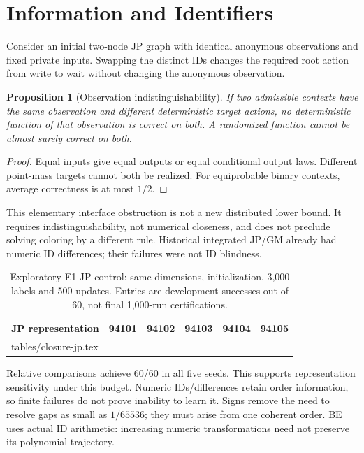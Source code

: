 \documentclass[10pt]{article}
\makeatletter
\newtheorem{proposition}{Proposition}
\let\closureinput\@@input
\makeatother
\begin{document}
\section{Information and Identifiers}\label{app:ids}
Consider an initial two-node JP graph with identical anonymous observations
and fixed private inputs. Swapping the distinct IDs changes the required
root action from write to wait without changing the anonymous observation.
\begin{proposition}[Observation indistinguishability]\label{prop:ids}
If two admissible contexts have the same observation and different
deterministic target actions, no deterministic function of that observation
is correct on both. A randomized function cannot be almost surely correct
on both.
\end{proposition}
\begin{proof}
Equal inputs give equal outputs or equal conditional output laws. Different
point-mass targets cannot both be realized. For equiprobable binary contexts,
average correctness is at most $1/2$.
\end{proof}
This elementary interface obstruction is not a new distributed lower bound.
It requires indistinguishability, not numerical closeness, and does not
preclude solving coloring by a different rule. Historical integrated JP/GM
already had numeric ID differences; their failures were not ID blindness.

\begin{table}[htbp]\centering\small
\begin{tabular}{lrrrrr}
\toprule JP representation & 94101 & 94102 & 94103 & 94104 & 94105 \\
\midrule
\closureinput tables/closure-jp.tex
\bottomrule
\end{tabular}
\caption{Exploratory E1 JP control: same dimensions, initialization, 3,000
labels and 500 updates. Entries are development successes out of 60,
not final 1,000-run certifications.}
\label{tab:ids}
\end{table}
Relative comparisons achieve 60/60 in all five seeds. This supports
representation sensitivity under this budget. Numeric IDs/differences retain
order information, so finite failures do not prove inability to learn it.
Signs remove the need to resolve gaps as small as $1/65536$; they must arise
from one coherent order. BE uses actual ID arithmetic: increasing numeric
transformations need not preserve its polynomial trajectory.
\end{document}
